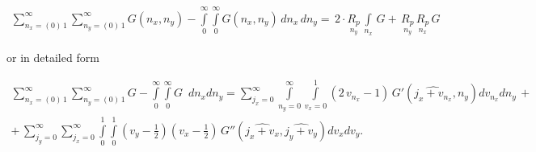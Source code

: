 \documentclass[twoside, 10pt, ptm]{article}
\begin{document}
    \begin{equation}
\begin{array}{r}
\sum\limits_{n_x=\left(0\right)\,1}^{\infty}
\sum\limits_{n_y=\left(0\right)\,1}^{\infty}
G\left(n_x, n_y\right)
-
\int\limits_{0}^{\infty}
\int\limits_{0}^{\infty}
G\left(n_x, n_y\right)\,d{n_x}\,d{n_y} =
\,2\cdot\underset{n_y}{R_{p}}\,\int\limits_{n_x}^{}\,G 
+\,\underset{n_y}{R_{p}}\,\underset{n_x}{R_{p}}\,G
\end{array}
\end{equation}

    or in detailed form

\noindent
\begin{equation}
\begin{array}{r}
\sum\limits_{n_x=\left(0\right)\,1}^{\infty}
\sum\limits_{n_y=\left(0\right)\,1}^{\infty}
G%
-
\int\limits_{0}^{\infty}
\int\limits_{0}^{\infty}
G%
\,\,\, d{n_x} d{n_y}  =
{\sum\limits_{j_{x}=0}^{\infty} \int\limits_{n_{y}=0}^{\infty} \int\limits_{v_x=0}^{1}  {\left(2 \, v_{n_{x}} - 1\right)}\, G'\left(\widehat{j_{x} + v_{n_{x}}}, n_{y}\right) {d v_{n_{x}}} {d n_{y}}} \, + \\
 + \,\sum\limits_{j_{y}=0}^{\infty} \sum\limits_{j_{x}=0}^{\infty} \int\limits_{0}^{1} \int\limits_{0}^{1} {\left(v_{y} - \frac{1}{2}\right)} {\left(v_{x} - \frac{1}{2}\right)} \, G''\left(\widehat{j_{x} + v_{x}}, \widehat{j_{y} + v_{y}}\right){d v_{x}}{d v_{y}}.
\end{array}
\end{equation}
\end{document}
